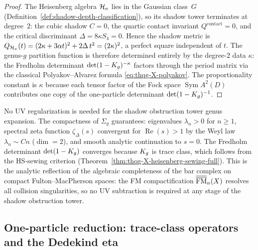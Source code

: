 \begin{proof}
The Heisenberg algebra $\mathcal{H}_\kappa$ lies in the Gaussian class~$G$
(Definition~\ref{def:shadow-depth-classification}), so its shadow
tower terminates at degree~$2$: the cubic shadow $C = 0$, the quartic
contact invariant $Q^{\mathrm{contact}} = 0$, and the critical
discriminant $\Delta = 8\kappa S_4 = 0$. Hence the shadow metric is
$Q_{\mathcal{H}_\kappa}(t) = (2\kappa + 3\alpha t)^2 + 2\Delta\,t^2
= (2\kappa)^2$, a perfect square independent of $t$.
The genus-$g$ partition function is therefore determined entirely
by the degree-$2$ data $\kappa$: the Fredholm determinant
$\det(1 - K_g)^{-\kappa}$ factors through the period matrix
via the classical Polyakov--Alvarez formula
\eqref{eq:thqg-X-polyakov}. The proportionality constant is
$\kappa$ because each tensor factor of the Fock space
$\operatorname{Sym} A^2(D)$ contributes one copy of the
one-particle determinant $\det(1 - K_g)^{-1}$.
\end{proof}

\begin{remark}%
\label{rem:uv-finiteness-compactness}%
%
No UV regularization is needed for the shadow obstruction tower genus expansion.
The compactness of $\Sigma_g$ guarantees: eigenvalues $\lambda_n > 0$
for $n \geq 1$, spectral zeta function $\zeta_\Delta(s)$
convergent for $\operatorname{Re}(s) > 1$ by the Weyl law
$\lambda_n \sim C n$ ($\dim = 2$), and smooth analytic continuation
to $s = 0$. The Fredholm determinant $\det(1 - K_g)$
converges because $K_g$ is trace class, which follows from
the HS-sewing criterion
(Theorem~\ref{thm:thqg-X-heisenberg-sewing-full}).
This is the analytic reflection of the algebraic completeness of the
bar complex on compact Fulton--MacPherson spaces: the FM
compactification $\overline{\overline{\operatorname{FM}}}_n(X)$ resolves all collision
singularities, so no UV subtraction is required at any stage of the
shadow obstruction tower.
\end{remark}

%
%

\subsection{One-particle reduction: trace-class operators
and the Dedekind eta}
\label{subsec:thqg-X-one-particle}

